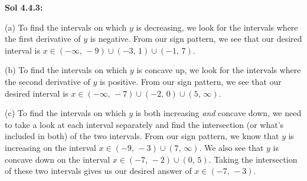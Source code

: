 \begin{tcolorbox}[solution]
    \textbf{Sol 4.4.3:} \par 
    (a) To find the intervals on which $y$ is decreasing, we look for the intervals where the first derivative of $y$ is negative. From our sign pattern, we see that our desired interval is $\boxed{x \in (-\infty, \, -9) \cup (-3, \, 1) \cup (-1, \, 7)}$. \par 
    \vspace{11pt}
    (b) To find the intervals on which $y$ is concave up, we look for the intervals where the second derivative of $y$ is positive. From our sign pattern, we see that our desired interval is $\boxed{x \in (-\infty, \, -7) \cup (-2, \, 0) \cup (5, \, \infty)}$. \par 
    \vspace{11pt}
    (c) To find the intervals on which $y$ is both increasing \textit{and} concave down, we need to take a look at each interval separately and find the intersection (or what's included in both) of the two intervals. From our sign pattern, we know that $y$ is increasing on the interval $x \in (-9, \, -3) \cup (7, \, \infty)$. We also see that $y$ is concave down on the interval $x \in (-7, \, -2) \cup (0, \, 5)$. Taking the intersection of these two intervals gives us our desired answer of $\boxed{x \in (-7, \, -3)}$.
\end{tcolorbox} \vspace{11pt}


